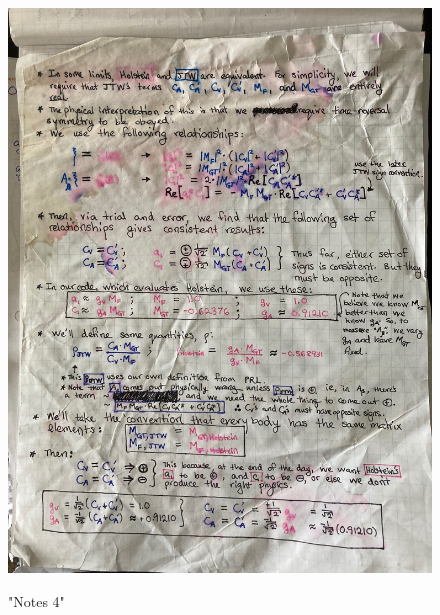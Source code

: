 \begin{figure}[htb]
	\centering
	{\includegraphics[width=.999\linewidth]
	{Figures/oldnotes_holstein_jtw/image4.jpg} }
	\caption{"Notes 4"}
	\label{fig:notes4}
\end{figure}

